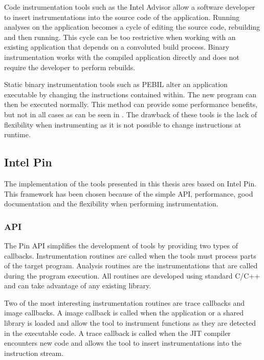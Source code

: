 Code instrumentation tools such as the Intel Advisor \cite{inteladvisor} allow a software developer to insert instrumentations into the source code of the application. Running analyses on the application becomes a cycle of editing the source code, rebuilding and then running. This cycle can be too restrictive when working with an existing application that depends on a convoluted build process. Binary instrumentation works with the compiled application directly and does not require the developer to perform rebuilds.

Static binary instrumentation tools such as PEBIL \cite{pebil} alter an application executable by changing the instructions contained within. The new program can then be executed normally. This method can provide some performance benefits, but not in all cases as can be seen in \cite{pebilperf}. The drawback of these tools is the lack of flexibility when instrumenting as it is not possible to change instructions at runtime.

\subsection{Intel Pin}

The implementation of the tools presented in this thesis ares based on Intel Pin. This framework has been chosen because of the simple API, performance, good documentation and the flexibility when performing instrumentation.

\subsubsection{API}

The Pin API \cite{pindoc} simplifies the development of tools by providing two types of callbacks. Instrumentation routines are called when the tools must process parts of the target program. Analysis routines are the instrumentations that are called during the program execution. All routines are developed using standard C/C++ and can take advantage of any existing library.

Two of the most interesting instrumentation routines are trace callbacks and image callbacks. A image callback is called when the application or a shared library is loaded and allow the tool to instrument functions as they are detected in the executable code. A trace callback is called when the JIT compiler encounters new code and allows the tool to insert instrumentations into the instruction stream.

